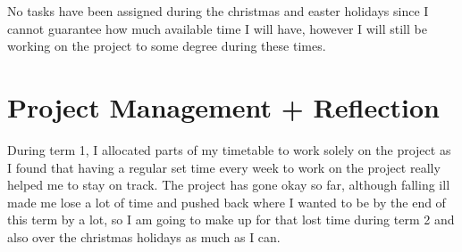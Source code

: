 \documentclass[12pt, a4paper]{article}
\begin{document}
No tasks have been assigned during the christmas and easter holidays since I cannot guarantee how much available time I will have, however I will still be working on the project to some degree during these times.

\section{Project Management + Reflection}
During term 1, I allocated parts of my timetable to work solely on the project as I found that having a regular set time every week to work on the project really helped me to stay on track. The project has gone okay so far, although falling ill made me lose a lot of time and pushed back where I wanted to be by the end of this term by a lot, so I am going to make up for that lost time during term 2 and also over the christmas holidays as much as I can.

\pagebreak
\printbibliography


\appendix

\end{document}
